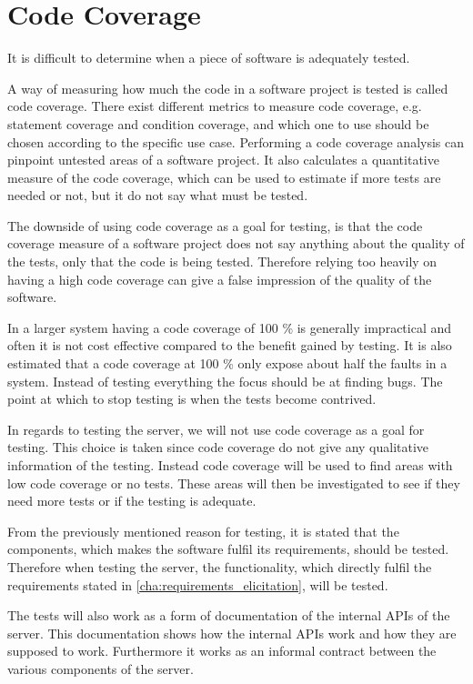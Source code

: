 \section{Code Coverage}\label{sec:code_coverage}
It is difficult to determine when a piece of software is adequately tested.

A way of measuring how much the code in a software project is tested is called code coverage.
There exist different metrics to measure code coverage, e.g. statement coverage and condition coverage,
and which one to use should be chosen according to the specific use case.
Performing a code coverage analysis can pinpoint untested areas of a software project.
It also calculates a quantitative measure of the code coverage,
which can be used to estimate if more tests are needed or not,
but it do not say what must be tested.\cite{code_coverage}

The downside of using code coverage as a goal for testing,
is that the code coverage measure of a software project does not say anything about the quality of the tests,
only that the code is being tested.
Therefore relying too heavily on having a high code coverage can give a false impression of the quality of the software.\cite{code_coverage_neg}

In a larger system having a code coverage of 100 \% is generally impractical and often it is not cost effective compared to the benefit gained by testing.
It is also estimated that a code coverage at 100 \% only expose about half the faults in a system.
Instead of testing everything the focus should be at finding bugs.
The point at which to stop testing is when the tests become contrived.\cite{code_coverage_not_100}

\bigskip

In regards to testing the server, we will not use code coverage as a goal for testing.
This choice is taken since code coverage do not give any qualitative information of the testing.
Instead code coverage will be used to find areas with low code coverage or no tests.
These areas will then be investigated to see if they need more tests or if the testing is adequate.

From the previously mentioned reason for testing,
it is stated that the components, which makes the software fulfil its requirements, should be tested.
Therefore when testing the server, the functionality,
which directly fulfil the requirements stated in \cref{cha:requirements_elicitation}, will be tested.

The tests will also work as a form of documentation of the internal \acp{API} of the server. 
This documentation shows how the internal \acp{API} work and how they are supposed to work.
Furthermore it works as an informal contract between the various components of the server.

